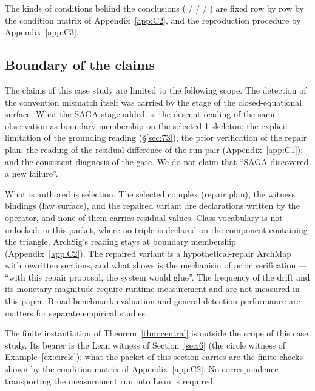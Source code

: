The kinds of conditions behind the conclusions ( /
 /  / ) are fixed row by
row by the condition matrix of Appendix~\ref{app:C2}, and the
reproduction procedure by Appendix~\ref{app:C3}.

\subsection{Boundary of the claims}\label{sec:75}

The claims of this case study are limited to the following scope. The
detection of the convention mismatch itself was carried by the stage
of the closed-equational surface. What the SAGA stage added is: the
descent reading of the same observation as boundary membership on the
selected 1-skeleton; the explicit limitation of the grounding reading
(\S\ref{sec:73}); the prior verification of the repair plan; the
reading of the residual difference of the run pair (Appendix~\ref{app:C1});
and the consistent diagnosis of the gate. We do not claim that ``SAGA
discovered a new failure''.

What is authored is selection. The selected complex (repair plan), the
witness bindings (law surface), and the repaired variant are
declarations written by the operator, and none of them carries
residual values. Class vocabulary is not unlocked: in this packet,
where no triple is declared on the component containing the triangle,
ArchSig's reading stays at boundary membership (Appendix~\ref{app:C2}). The
repaired variant is a hypothetical-repair ArchMap with rewritten
sections, and what  shows is the
mechanism of prior verification --- ``with this repair proposal, the
system would glue''. The frequency of the drift and its monetary
magnitude require runtime measurement and are not measured in this
paper. Broad benchmark evaluation and general detection performance
are matters for separate empirical studies.

The finite instantiation of Theorem~\ref{thm:central} is outside the
scope of this case study. Its bearer is the Lean witness of
Section~\ref{sec:6} (the circle witness of Example~\ref{ex:circle});
what the packet of this section carries are the finite checks shown by
the condition matrix of Appendix~\ref{app:C2}. No correspondence transporting
the measurement run into Lean is required.
